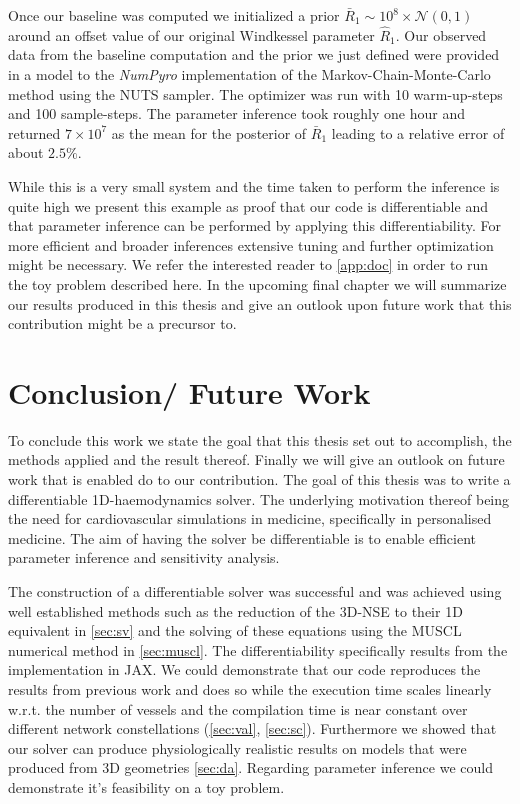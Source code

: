 \documentclass[a4paper, oneside]{discothesis}
\begin{document}
Once our baseline was computed we initialized a prior $\bar{R}_1 \sim 10^8 \times \mathcal{N}(0,1)$ around an offset value of our original Windkessel parameter $\hat{R}_1$.
Our observed data from the baseline computation and the prior we just defined were provided in a model to the \emph{NumPyro} \cite{phan2019composable,bingham2019pyro} implementation of the Markov-Chain-Monte-Carlo method using the NUTS sampler.
The optimizer was run with 10 warm-up-steps and 100 sample-steps.
The parameter inference took roughly one hour and returned $7 \times 10^7$ as the mean for the posterior of $\bar{R}_1$ leading to a relative error of about $2.5\%$.

While this is a very small system and the time taken to perform the inference is quite high we present this example as proof that our code is differentiable and that parameter inference can be performed by applying this differentiability.
For more efficient and broader inferences extensive tuning and further optimization might be necessary. We refer the interested reader to \autoref{app:doc} in order to run the toy problem described here.
In the upcoming final chapter we will summarize our results produced in this thesis and give an outlook upon future work that this contribution might be a precursor to.

\chapter{Conclusion/ Future Work} \label{chap:conc}
To conclude this work we state the goal that this thesis set out to accomplish, the methods applied and the result thereof.
Finally we will give an outlook on future work that is enabled do to our contribution.
The goal of this thesis was to write a differentiable 1D-haemodynamics solver.
The underlying motivation thereof being the need for cardiovascular simulations in medicine, specifically in personalised medicine.
The aim of having the solver be differentiable is to enable efficient parameter inference and sensitivity analysis.

The construction of a differentiable solver was successful and was achieved using well established methods such as the reduction of the 3D-NSE to their 1D equivalent in \autoref{sec:sv} and the solving of these equations using the MUSCL numerical method in \autoref{sec:muscl}.
The differentiability specifically results from the implementation in JAX.
We could demonstrate that our code reproduces the results from previous work and does so while the execution time scales linearly w.r.t. the number of vessels and the compilation time is near constant over different network constellations (\autoref{sec:val}, \autoref{sec:sc}).
Furthermore we showed that our solver can produce physiologically realistic results on models that were produced from 3D geometries \autoref{sec:da}.
Regarding parameter inference we could demonstrate it's feasibility on a toy problem.
\end{document}
